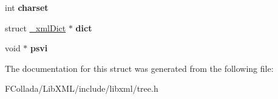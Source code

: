 \begin{DoxyCompactItemize}
\item 
\hypertarget{struct__xmlDoc_a32382a4784bbd3d6c928d8cd7349305b}{
int {\bfseries charset}}
\label{struct__xmlDoc_a32382a4784bbd3d6c928d8cd7349305b}

\item 
\hypertarget{struct__xmlDoc_ab6f89d12264ac64a920ca920329f336f}{
struct \hyperlink{struct__xmlDict}{\_\-xmlDict} $\ast$ {\bfseries dict}}
\label{struct__xmlDoc_ab6f89d12264ac64a920ca920329f336f}

\item 
\hypertarget{struct__xmlDoc_af22a189e5ec5b98d7992cac8ef3dbb38}{
void $\ast$ {\bfseries psvi}}
\label{struct__xmlDoc_af22a189e5ec5b98d7992cac8ef3dbb38}

\end{DoxyCompactItemize}


The documentation for this struct was generated from the following file:\begin{DoxyCompactItemize}
\item 
FCollada/LibXML/include/libxml/tree.h\end{DoxyCompactItemize}
